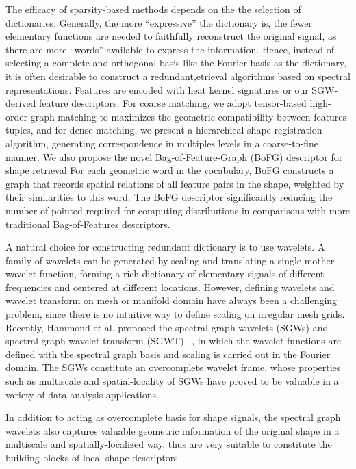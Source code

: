 The efficacy of sparsity-based methods depends on the the selection of dictionaries.
Generally, the more ``expressive'' the dictionary is, the fewer elementary functions
are needed to faithfully reconstruct the original signal, as there are more ``words''
available to express the information. Hence, instead of selecting a complete and orthogonal basis
like the Fourier basis as the dictionary, it is often desirable to construct a redundant,etrieval algorithms based on spectral
representations. Features are encoded with heat kernel signatures
or our SGW-derived feature descriptors. For coarse matching, we adopt
tensor-based high-order graph matching to maximizes the
geometric compatibility between features tuples, and for dense matching,
we present a hierarchical shape registration algorithm, generating
correspondence in multiples levels in a coarse-to-fine manner. We also
propose the novel Bag-of-Feature-Graph (BoFG) descriptor for shape retrieval
For each geometric word in the vocabulary, BoFG constructs a graph that records
spatial relations of all feature pairs in the shape, weighted by their
similarities to this word. The BoFG descriptor significantly reducing the number
of pointed required for computing distributions in comparisons with more traditional
Bag-of-Features descriptors.

A natural choice for constructing redundant dictionary is to use wavelets. A family
of wavelets can be generated by scaling and translating a single mother wavelet function,
forming a rich dictionary of elementary signals of different frequencies and centered
at different locations. However, defining wavelets and wavelet transform on mesh or
manifold domain have always been a challenging problem, since there is no intuitive way
to define scaling on irregular mesh grids. Recently, Hammond et al. proposed the spectral
graph wavelets (SGWs) and spectral graph wavelet transform (SGWT)~\cite{Hammond2011}
, in which the wavelet functions are defined with the spectral graph basis and scaling is carried
out in the Fourier domain. The SGWs constitute an overcomplete wavelet frame, whose properties
such as multiscale and spatial-locality of SGWs have proved to be valuable in a variety of data
analysis applications.

In addition to acting as overcomplete basis for shape signals, the spectral
graph wavelets also captures valuable geometric information of the original
shape in a multiscale and spatially-localized way, thus are very suitable to
constitute the building blocks of local shape descriptors.

